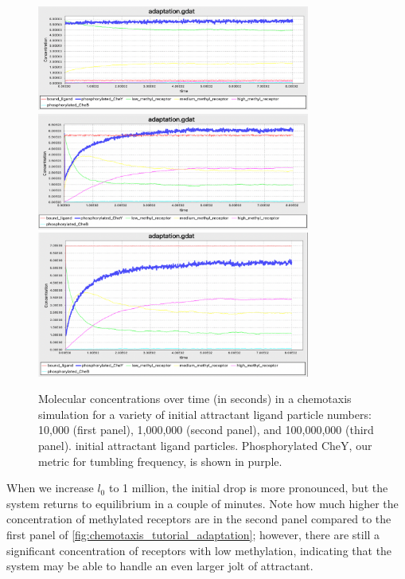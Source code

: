 \begin{figure}[h]
\centering
\mySfFamily
\includegraphics[width = 0.8\textwidth]{../images/chemotaxis_tutorial_oneadd1e4.png}\\[2ex]
\includegraphics[width = 0.8\textwidth]{../images/chemotaxis_tutorial_oneadd1e6.png}\\[2ex]
\includegraphics[width = 0.8\textwidth]{../images/chemotaxis_tutorial_oneadd1e8.png}
\caption{Molecular concentrations over time (in seconds) in a chemotaxis simulation for a variety of initial attractant ligand particle numbers: 10,000 (first panel), 1,000,000 (second panel), and 100,000,000 (third panel). initial attractant ligand particles. Phosphorylated CheY, our metric for tumbling frequency, is shown in purple.}
\label{fig:chemotaxis_tutorial_adaptation}
\end{figure}

When we increase $l_0$ to 1 million, the initial drop is more pronounced, but the system returns  to equilibrium in a couple of minutes. Note how much higher the concentration of methylated receptors are in the second panel compared to the first panel of \autoref{fig:chemotaxis_tutorial_adaptation}; however, there are still a significant concentration of receptors with low methylation, indicating that the system may be able to handle an even larger jolt of attractant.

